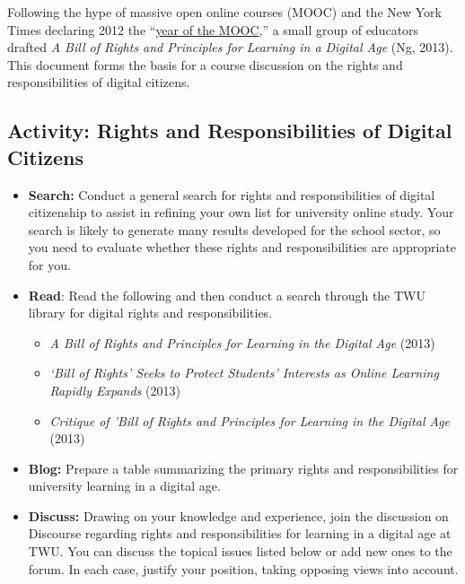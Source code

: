 \documentclass[
  letterpaper,
  DIV=11,
  numbers=noendperiod]{scrreprt}
\providecommand{\tightlist}{%
  \setlength{\itemsep}{0pt}\setlength{\parskip}{0pt}}\usepackage{longtable,booktabs,array}
\begin{document}
Following the hype of massive open online courses (MOOC) and the New
York Times declaring 2012 the
``\href{https://www.nytimes.com/2012/11/04/education/edlife/massive-open-online-courses-are-multiplying-at-a-rapid-pace.html}{year
of the MOOC},'' a small group of educators drafted \emph{A Bill of
Rights and Principles for Learning in a Digital Age} (Ng, 2013). This
document forms the basis for a course discussion on the rights and
responsibilities of digital citizens.

\subsection{Activity: Rights and Responsibilities of Digital
Citizens}\label{activity-rights-and-responsibilities-of-digital-citizens}

\begin{tcolorbox}[enhanced jigsaw, toprule=.15mm, colback=white, colframe=quarto-callout-note-color-frame, bottomtitle=1mm, leftrule=.75mm, coltitle=black, titlerule=0mm, rightrule=.15mm, colbacktitle=quarto-callout-note-color!10!white, left=2mm, title={Learning Activity}, opacitybacktitle=0.6, opacityback=0, breakable, toptitle=1mm, arc=.35mm, bottomrule=.15mm]

\begin{itemize}
\tightlist
\item
  \textbf{Search:} Conduct a general search for rights and
  responsibilities of digital citizenship to assist in refining your own
  list for university online study. Your search is likely to generate
  many results developed for the school sector, so you need to evaluate
  whether these rights and responsibilities are appropriate for you.
\item
  \textbf{Read}: Read the following and then conduct a search through
  the TWU library for digital rights and responsibilities.

  \begin{itemize}
  \tightlist
  \item
    \emph{A Bill of Rights and Principles for Learning in the Digital
    Age} (2013)
  \item
    \emph{`Bill of Rights' Seeks to Protect Students' Interests as
    Online Learning Rapidly Expands} (2013)
  \item
    \emph{Critique of 'Bill of Rights and Principles for Learning in the
    Digital Age} (2013)
  \end{itemize}
\item
  \textbf{Blog:} Prepare a table summarizing the primary rights and
  responsibilities for university learning in a digital age.
\item
  \textbf{Discuss:} Drawing on your knowledge and experience, join the
  discussion on Discourse regarding rights and responsibilities for
  learning in a digital age at TWU. You can discuss the topical issues
  listed below or add new ones to the forum. In each case, justify your
  position, taking opposing views into account.
\end{itemize}


\end{tcolorbox}
\end{document}
